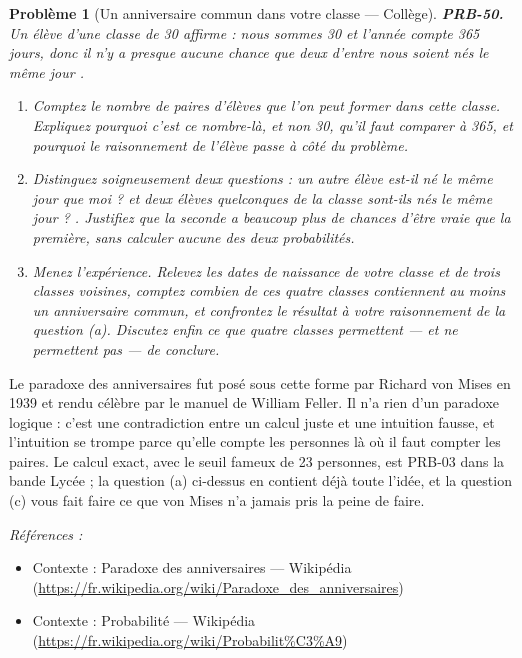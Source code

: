 \documentclass[11pt]{article}
\newtheorem{problem}{Problème}
\newenvironment{refs}{\par\small\noindent\emph{Références :}\begin{itemize}\setlength\itemsep{0pt}}{\end{itemize}\normalsize}
\begin{document}
\bigskip

\begin{problem}[{Un anniversaire commun dans votre classe --- Collège}]
\textbf{PRB-50.} Un élève d'une classe de 30 affirme : \og{} nous sommes 30 et l'année compte 365
jours, donc il n'y a presque aucune chance que deux d'entre nous soient nés le même jour \fg{}.
\begin{enumerate}
\item[(a)] Comptez le nombre de paires d'élèves que l'on peut former dans cette classe. Expliquez
pourquoi c'est ce nombre-là, et non 30, qu'il faut comparer à 365, et pourquoi le raisonnement de
l'élève passe à côté du problème.
\item[(b)] Distinguez soigneusement deux questions : \og{} un autre élève est-il né le même jour que
\textit{moi} ? \fg{} et \og{} deux élèves quelconques de la classe sont-ils nés le même jour ? \fg{}. Justifiez
que la seconde a beaucoup plus de chances d'être vraie que la première, sans calculer aucune des
deux probabilités.
\item[(c)] Menez l'expérience. Relevez les dates de naissance de votre classe et de trois classes
voisines, comptez combien de ces quatre classes contiennent au moins un anniversaire commun, et
confrontez le résultat à votre raisonnement de la question (a). Discutez enfin ce que quatre
classes permettent --- et ne permettent pas --- de conclure.
\end{enumerate}

\end{problem}

\noindent Le paradoxe des anniversaires fut posé sous cette forme par Richard von Mises en
1939 et rendu célèbre par le manuel de William Feller. Il n'a rien d'un paradoxe logique : c'est
une contradiction entre un calcul juste et une intuition fausse, et l'intuition se trompe parce
qu'elle compte les personnes là où il faut compter les paires. Le calcul exact, avec le seuil
fameux de 23 personnes, est PRB-03 dans la bande Lycée ; la question (a) ci-dessus en contient déjà
toute l'idée, et la question (c) vous fait faire ce que von Mises n'a jamais pris la peine de
faire.

\begin{refs}
\item Contexte : Paradoxe des anniversaires --- Wikipédia (\url{https://fr.wikipedia.org/wiki/Paradoxe_des_anniversaires})
\item Contexte : Probabilité --- Wikipédia (\url{https://fr.wikipedia.org/wiki/Probabilit%C3%A9})
\end{refs}
\end{document}
